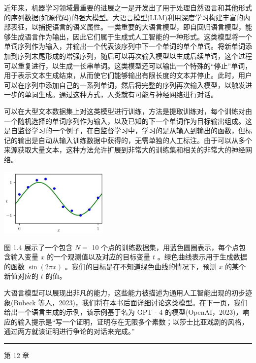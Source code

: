 \documentclass[10pt]{article}
\newcommand{\HRule}{\begin{center}\rule{0.9\linewidth}{0.2mm}\end{center}}
\begin{document}
近年来，机器学习领域最重要的进展之一是开发出了用于处理自然语言和其他形式的序列数据(如源代码)的强大模型。大语言模型(LLM)利用深度学习构建丰富的内部表征，以捕捉语言的语义属性。一类重要的大语言模型，即自回归语言模型，能够生成语言作为输出，因此它们属于生成式人工智能的一种形式。这类模型将一个单词序列作为输入，并输出一个代表该序列中下一个单词的单个单词。将新单词添加到序列末尾形成的增强序列，随后可以再次输入模型以生成后续单词，这个过程可以重复进行，以生成一长串单词。这类模型还可以输出一个特殊的“停止”单词，用于表示文本生成结束，从而使它们能够输出有限长度的文本并停止。此时，用户可以在序列中添加自己的一系列单词，然后将完整的序列再次输入模型，以触发进一步的单词生成。通过这种方式，人类就有可能与神经网络进行对话。

可以在大型文本数据集上对这类模型进行训练，方法是提取训练对，每个训练对由一个随机选择的单词序列作为输入，以及已知的下一个单词作为目标输出组成。这是自监督学习的一个例子，在自监督学习中，学习的是从输入到输出的函数，但标记的输出是自动从输入训练数据中获得的，无需单独的人工标注。由于可以从多个来源获取大量文本，这种方法允许扩展到非常大的训练集和相关的非常大的神经网络。

\begin{center}
\includegraphics[max width=0.4\textwidth]{images/0194e279-9b28-703a-88f4-c3ac21e2010d_25_946_344_607_378_0.jpg}
\end{center}
\hspace*{3em} 

图 1.4 展示了一个包含 \(N =\) 10 个点的训练数据集，用蓝色圆圈表示，每个点包含输入变量 \(x\) 的一个观测值以及对应的目标变量 \(t\) 。绿色曲线表示用于生成数据的函数 \(\sin \left( {2\pi x}\right)\) 。我们的目标是在不知道绿色曲线的情况下，预测 \(x\) 的某个新值对应的 \(t\) 的值。

大语言模型可以展现出非凡的能力，这些能力被描述为通用人工智能出现的初步迹象(Bubeck 等人，2023)，我们将在本书后面详细讨论这类模型。在下一页，我们给出一个语言生成的示例，该示例基于名为 GPT - 4 的模型(OpenAI，2023)，响应的输入提示是“写一个证明，证明存在无限多个素数；以莎士比亚戏剧的风格，通过两方就该证明进行争论的对话来完成。”

\HRule

第 12 章
\end{document}
